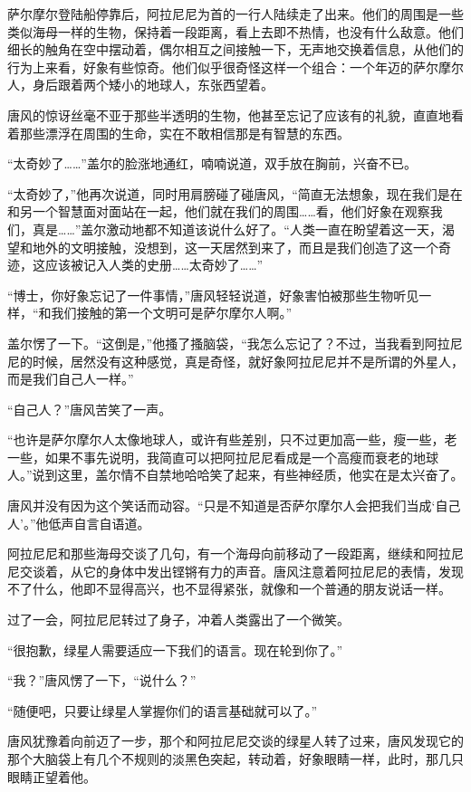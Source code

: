 萨尔摩尔登陆船停靠后，阿拉尼尼为首的一行人陆续走了出来。他们的周围是一些类似海母一样的生物，保持着一段距离，看上去即不热情，也没有什么敌意。他们细长的触角在空中摆动着，偶尔相互之间接触一下，无声地交换着信息，从他们的行为上来看，好象有些惊奇。他们似乎很奇怪这样一个组合：一个年迈的萨尔摩尔人，身后跟着两个矮小的地球人，东张西望着。

唐风的惊讶丝毫不亚于那些半透明的生物，他甚至忘记了应该有的礼貌，直直地看着那些漂浮在周围的生命，实在不敢相信那是有智慧的东西。

“太奇妙了……”盖尔的脸涨地通红，喃喃说道，双手放在胸前，兴奋不已。

“太奇妙了，”他再次说道，同时用肩膀碰了碰唐风，“简直无法想象，现在我们是在和另一个智慧面对面站在一起，他们就在我们的周围……看，他们好象在观察我们，真是……”盖尔激动地都不知道该说什么好了。“人类一直在盼望着这一天，渴望和地外的文明接触，没想到，这一天居然到来了，而且是我们创造了这一个奇迹，这应该被记入人类的史册……太奇妙了……”

“博士，你好象忘记了一件事情，”唐风轻轻说道，好象害怕被那些生物听见一样，“和我们接触的第一个文明可是萨尔摩尔人啊。”

盖尔愣了一下。“这倒是，”他搔了搔脑袋，“我怎么忘记了？不过，当我看到阿拉尼尼的时候，居然没有这种感觉，真是奇怪，就好象阿拉尼尼并不是所谓的外星人，而是我们自己人一样。”

“自己人？”唐风苦笑了一声。

“也许是萨尔摩尔人太像地球人，或许有些差别，只不过更加高一些，瘦一些，老一些，如果不事先说明，我简直可以把阿拉尼尼看成是一个高瘦而衰老的地球人。”说到这里，盖尔情不自禁地哈哈笑了起来，有些神经质，他实在是太兴奋了。

唐风并没有因为这个笑话而动容。“只是不知道是否萨尔摩尔人会把我们当成‘自己人’。”他低声自言自语道。

阿拉尼尼和那些海母交谈了几句，有一个海母向前移动了一段距离，继续和阿拉尼尼交谈着，从它的身体中发出铿锵有力的声音。唐风注意着阿拉尼尼的表情，发现不了什么，他即不显得高兴，也不显得紧张，就像和一个普通的朋友说话一样。

过了一会，阿拉尼尼转过了身子，冲着人类露出了一个微笑。

“很抱歉，绿星人需要适应一下我们的语言。现在轮到你了。”

“我？”唐风愣了一下，“说什么？”

“随便吧，只要让绿星人掌握你们的语言基础就可以了。”

唐风犹豫着向前迈了一步，那个和阿拉尼尼交谈的绿星人转了过来，唐风发现它的那个大脑袋上有几个不规则的淡黑色突起，转动着，好象眼睛一样，此时，那几只眼睛正望着他。

